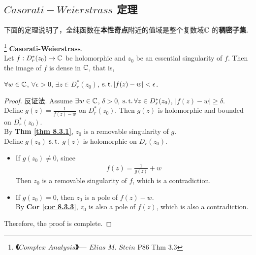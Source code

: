 \vspace{2em}
\subsection{$Casorati-Weierstrass$ 定理}
	下面的定理说明了，全纯函数在\textbf{本性奇点}附近的值域是整个复数域$\mathbb{C}$ 的\textbf{稠密子集}.
	\begin{thm}\label{thm 8.5.1}\footnote{\textbf{《$Complex \,\, Analysis$》---  $Elias \,\, M. \,\, Stein$} P86 Thm 3.3}
		\textbf{Casorati-Weierstrass}. \\
		Let $f : D_{r}^{*}(z_0) \rightarrow \mathbb{C}$ be holomorphic and $z_0$ be an essential singularity of $f$. Then the image of $f$ is dense in $\mathbb{C}$, that is,
		\begin{center}
			$\forall w \in \mathbb{C}$, $\forall \epsilon > 0$, $\exists z \in D_{r}^{*}(z_0)$, $\operatorname{s.t.} \left| f(z) - w \right| < \epsilon$.
		\end{center}
	
		\vspace{4em}
		\begin{proof}
			反证法. Assume $\exists w \in \mathbb{C}$, $\delta > 0$, $\operatorname{s.t.} \forall z \in D_{r}^{*}(z_0)$, $\left| f(z) - w \right| \geq \delta$. \\
			Define $g(z) = \frac{1}{f(z) - w}$ on $D_{r}^{*}(z_0)$. Then $g(z)$ is holomorphic and bounded on $D_{r}^{*}(z_0)$. \\
			By \textbf{Thm \ref{thm 8.3.1}}, $z_0$ is a removable singularity of $g$. \\
			Define $g(z_0)$ $\operatorname{s.t.}$ $g(z)$ is holomorphic on $D_{r}(z_0)$.
			
			\vspace{1em}
			
			\begin{itemize}
				\item If $g(z_0) \neq 0$, since
				\begin{align}
					f(z) = \frac{1}{g(z)} + w
				\end{align}
				Then $z_0$ is a removable singularity of $f$, which is a contradiction.
				
				\vspace{2em}
				
				\item If $g(z_0) = 0$, then $z_0$ is a pole of $f(z) - w$. \\
				By \textbf{Cor \ref{cor 8.3.3}}, $z_0$ is also a pole of $f(z)$, which is also a contradiction.
			\end{itemize}
		
			\vspace{1em}
			
			Therefore, the proof is complete.
		\end{proof}
	\end{thm}

